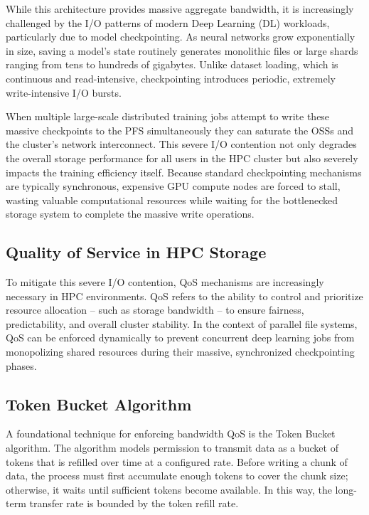 \documentclass[sigplan,twocolumn,10pt,nonacm]{acmart}
\begin{document}
While this architecture provides massive aggregate bandwidth, it is increasingly challenged by the I/O patterns of modern Deep Learning
(DL) workloads, particularly due to model checkpointing. As neural networks grow exponentially in size, saving a model's state routinely
generates monolithic files or large shards ranging from tens to hundreds of gigabytes. Unlike dataset loading, which is continuous and
read-intensive, checkpointing introduces periodic, extremely write-intensive I/O bursts.

When multiple large-scale distributed training jobs attempt to write these massive checkpoints to the PFS simultaneously they can saturate
the OSSs and the cluster's network interconnect. This severe I/O contention not only degrades the overall storage performance for all users
in the HPC cluster but also severely impacts the training efficiency itself. Because standard checkpointing mechanisms are typically synchronous,
expensive GPU compute nodes are forced to stall, wasting valuable computational resources while waiting for the bottlenecked storage system to
complete the massive write operations.

\subsection{Quality of Service in HPC Storage}

To mitigate this severe I/O contention, QoS mechanisms are increasingly necessary in HPC environments. QoS refers to the
ability to control and prioritize resource allocation -- such as storage bandwidth -- to ensure fairness, predictability, and overall cluster stability.
In the context of parallel file systems, QoS can be enforced dynamically to prevent concurrent deep learning jobs from monopolizing shared resources
during their massive, synchronized checkpointing phases.

\subsection{Token Bucket Algorithm}

A foundational technique for enforcing bandwidth QoS is the Token Bucket
algorithm. The algorithm models permission to transmit data as a bucket of
tokens that is refilled over time at a configured rate. Before writing a chunk
of data, the process must first accumulate enough tokens to cover the chunk
size; otherwise, it waits until sufficient tokens become available. In this
way, the long-term transfer rate is bounded by the token refill rate.
\end{document}
